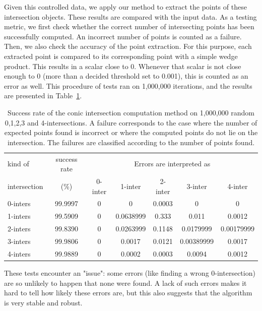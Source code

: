 \documentclass{birkjour}
\begin{document}
Given this controlled data, we apply our method to extract the points of these intersection objects. These results are compared with the input data. As a testing metric, we first check whether the correct number of intersecting points has been successfully computed. An incorrect number of points is counted as a failure. Then, we also check the accuracy of the point extraction. For this purpose, each extracted point is compared to its corresponding point with a simple wedge product. This results in a scalar close to 0. Whenever that scalar is not close enough to 0 (more than a decided threshold set to 0.001), this is counted as an error as well.
This procedure of tests ran on 1,000,000 iterations, and the results are presented in Table~\ref{tab:results}.
\begin{table}[!ht]
    \begin{center}
    \begin{tabular}{l|c|c|c|c|c|c}
        kind of& success rate &\multicolumn{5}{c}{Errors are interpreted as}\\
        intersection& (\%)& 0-inter & 1-inter & 2-inter & 3-inter & 4-inter\\
        \hline
0-inters & 99.9997 & 0 &         0 & 0.0003 &          0 &          0 \\
1-inters & 99.5909 & 0 & 0.0638999 &  0.333 &      0.011 &     0.0012 \\
2-inters & 99.8390 & 0 & 0.0263999 & 0.1148 &  0.0179999 & 0.00179999 \\
3-inters & 99.9806 & 0 &    0.0017 & 0.0121 & 0.00389999 &     0.0017 \\
4-inters & 99.9889 & 0 &    0.0002 & 0.0003 &     0.0094 &     0.0012 
    \end{tabular}
    \end{center}
\caption{Success rate of the conic intersection computation method on 1,000,000 random 0,1,2,3 and 4-intersections. A failure corresponds to the case where the number of expected points found is incorrect or where the computed points do not lie on the intersection. The failures are classified according to the number of points found.}	\label{tab:results}
\end{table}
These tests encounter an "issue": some errors (like finding a wrong 0-intersection) are so unlikely to happen that none were found. A lack of such errors makes it hard to tell how likely these errors are, but this also suggests that the algorithm is very stable and robust.
\end{document}
